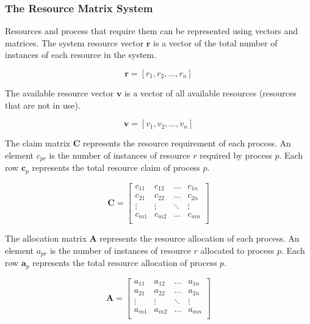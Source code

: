 \subsubsection{The Resource Matrix System}

Resources and process that require them can be represented using vectors and matrices.
The system resource vector \( \mathbf{r} \) is a vector of the total number of instances of each resource in the system.

\begin{equation*}
  \mathbf{r} = \left[ r_1, r_2, \ldots, r_n \right]
\end{equation*}

The available resource vector \( \mathbf{v} \) is a vector of all available resources (resources that are not in use).

\begin{equation*}
  \mathbf{v} = \left[ v_1, v_2, \ldots, v_n \right]
\end{equation*}

The claim matrix \( \mathbf{C} \) represents the resource requirement of each process.
An element \( c_{pr} \) is the number of instances of resource \( r \) required by process \( p \).
Each row \( \mathbf{c}_p \) represents the total resource claim of process \( p \).

\begin{equation*}
  \mathbf{C} = \begin{bmatrix}
    c_{11} & c_{12} & \ldots & c_{1n} \\
    c_{21} & c_{22} & \ldots & c_{2n} \\
    \vdots & \vdots & \ddots & \vdots \\
    c_{m1} & c_{m2} & \ldots & c_{mn} \\
  \end{bmatrix}
\end{equation*}

The allocation matrix \( \mathbf{A} \) represents the resource allocation of each process.
An element \( a_{pr} \) is the number of instances of resource \( r \) allocated to process \( p \).
Each row \( \mathbf{a}_p \) represents the total resource allocation of process \( p \).

\begin{equation*}
  \mathbf{A} = \begin{bmatrix}
    a_{11} & a_{12} & \ldots & a_{1n} \\
    a_{21} & a_{22} & \ldots & a_{2n} \\
    \vdots & \vdots & \ddots & \vdots \\
    a_{m1} & a_{m2} & \ldots & a_{mn} \\
  \end{bmatrix}
\end{equation*}

